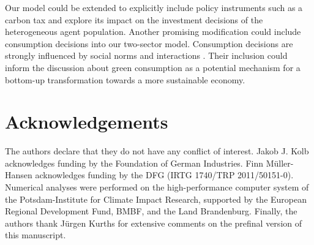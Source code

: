 Our model could be extended to explicitly include policy instruments such as a carbon tax and explore its impact on the investment decisions of the heterogeneous agent population.
Another promising modification could include consumption decisions into our two-sector model. Consumption decisions are strongly influenced by social norms and interactions \citep{Peattie2010}. Their inclusion could inform the discussion about green consumption as a potential mechanism for a bottom-up transformation towards a more sustainable economy.

\section*{Acknowledgements}
The authors declare that they do not have any conflict of interest. Jakob J. Kolb acknowledges funding by the Foundation of German Industries. Finn M\"{u}ller-Hansen acknowledges funding by the DFG (IRTG 1740/TRP 2011/50151-0).
Numerical analyses were performed on the high-performance computer system of the Potsdam-Institute for Climate Impact Research, supported by the European Regional Development Fund, BMBF, and the Land Brandenburg.
Finally, the authors thank J\"{u}rgen Kurths for extensive comments on the prefinal version of this manuscript.





